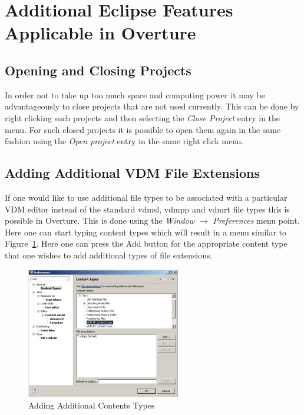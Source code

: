 \documentclass{overturerepchap}
\begin{document}
\section{Additional Eclipse Features Applicable in Overture}

\subsection{Opening and Closing Projects}

In order not to take up too much space and computing power it may be
advantageously to close projects that are not used currently. This can
be done by right clicking such projects and then selecting the
\emph{Close Project} entry in the menu.
For such closed projects it is possible
to open them again in the same fashion using the \emph{Open project}
entry in the same right click
menu. 
 

\subsection{Adding Additional VDM File Extensions}

If one would like to use additional file types to be associated with a
particular VDM editor instead of the standard {\ttfamily vdmsl},
{\ttfamily vdmpp} and {\ttfamily vdmrt} file types this is possible in
Overture. This is done using the \emph{Window} $\rightarrow$
\emph{Preferences} menu point. Here one can start typing {\ttfamily
  content types} which will result in a menu similar to
Figure~\ref{fig:ContentsTypes}. Here one can press the {\ttfamily Add}
button for the appropriate content type that one wishes to add
additional types of file extensions.

\begin{figure}[!htb]
\begin{center}
\includegraphics[width=0.6\textwidth]{screenDumps/contentstypes}
\caption{Adding Additional Contents Types\label{fig:ContentsTypes}}
\end{center}
\end{figure}
\end{document}
